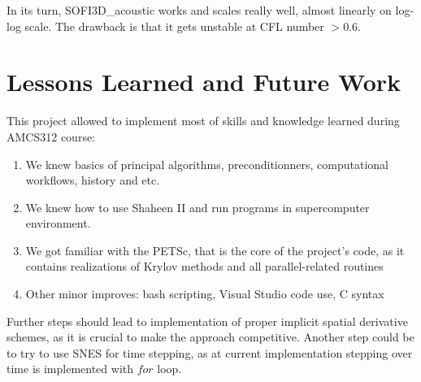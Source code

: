 \documentclass[12pt,a4paper]{report}
\begin{document}
In its turn, SOFI3D\_acoustic works and scales really well, almost linearly on log-log scale. The drawback is that it gets unstable at CFL number $>0.6$.


\section*{Lessons Learned and Future Work}

This project allowed to implement most of skills and knowledge learned during AMCS312 course:

\begin{enumerate}
\item We knew basics of principal algorithms, preconditionners, computational workflows, history and etc.

\item We knew how to use Shaheen II and run programs in supercomputer environment. 

\item We got familiar with the PETSc, that is the core of the project's code, as it contains realizations of Krylov methods and all parallel-related routines 

\item Other minor improves: bash scripting, Visual Studio code use, C syntax\\

\end{enumerate}

Further steps should lead to implementation of proper implicit spatial derivative schemes, as it is crucial to make the approach competitive. Another step could be to try to use SNES for time stepping, as at current implementation stepping over time is implemented with $for$ loop.



\end{document}
